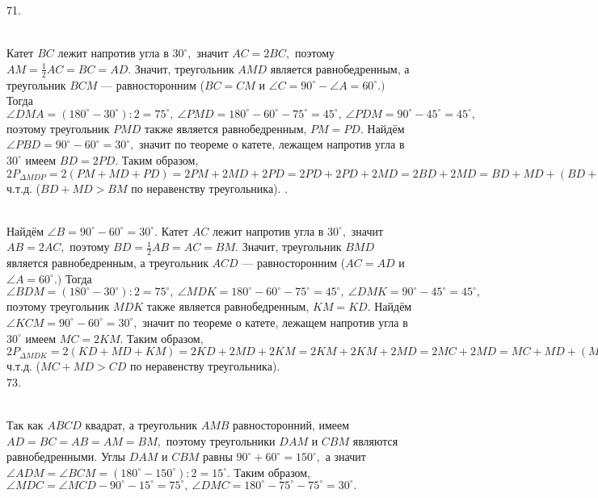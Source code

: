 71. \begin{figure}[ht!]
\end{figure}\\
Катет $BC$ лежит напротив угла в $30^\circ,$ значит $AC=2BC,$ поэтому $AM=\frac{1}{2}AC=BC=AD.$ Значит, треугольник $AMD$ является равнобедренным, а треугольник $BCM$ --- равносторонним ($BC=CM$ и $\angle C=90^\circ-\angle A=60^\circ.)$ Тогда $\angle DMA=(180^\circ-30^\circ):2=75^\circ,\ \angle PMD=180^\circ-60^\circ-75^\circ=45^\circ,\ \angle PDM=90^\circ-45^\circ=45^\circ,$ поэтому треугольник $PMD$ также является равнобедренным, $PM=PD.$ Найдём $\angle PBD=90^\circ-60^\circ=30^\circ,$ значит по теореме о катете, лежащем напротив угла в $30^\circ$ имеем $BD=2PD.$ Таким образом, $2P_{\Delta MDP}=2(PM+MD+PD)=
2PM+2MD+2PD=2PD+2PD+2MD=2BD+2MD=BD+MD+(BD+MD)>BD+MD+BM=P_{\Delta MDB},$ ч.т.д. ($BD+MD>BM$ по неравенству треугольника).\newpage
{}. \begin{figure}[ht!]
\end{figure}\\
Найдём $\angle B=90^\circ-60^\circ=30^\circ.$ Катет $AC$ лежит напротив угла в $30^\circ,$ значит $AB=2AC,$ поэтому $BD=\frac{1}{2}AB=AC=BM.$ Значит, треугольник $BMD$ является равнобедренным, а треугольник $ACD$ --- равносторонним ($AC=AD$ и $\angle A=60^\circ.)$ Тогда $\angle BDM=(180^\circ-30^\circ):2=75^\circ,\ \angle MDK=180^\circ-60^\circ-75^\circ=45^\circ,\ \angle DMK=90^\circ-45^\circ=45^\circ,$ поэтому треугольник $MDK$ также является равнобедренным, $KM=KD.$ Найдём $\angle KCM=90^\circ-60^\circ=30^\circ,$ значит по теореме о катете, лежащем напротив угла в $30^\circ$ имеем $MC=2KM.$ Таким образом, $2P_{\Delta MDK}=2(KD+MD+KM)=
2KD+2MD+2KM=2KM+2KM+2MD=2MC+2MD=MC+MD+(MC+MD)>MC+MD+CD=P_{\Delta DMC},$ ч.т.д. ($MC+MD>CD$ по неравенству треугольника).\\
73. \begin{figure}[ht!]
\end{figure}\\
Так как $ABCD$ квадрат, а треугольник $AMB$ равносторонний, имеем $AD=BC=AB=AM=BM,$ поэтому треугольники $DAM$ и $CBM$ являются равнобедренными. Углы $DAM$ и $CBM$ равны $90^\circ+60^\circ=150^\circ,$ а значит $\angle ADM=\angle BCM=(180^\circ-150^\circ):2=15^\circ.$ Таким образом, $\angle MDC=\angle MCD-90^\circ-15^\circ=75^\circ,\ \angle DMC=180^\circ-75^\circ-75^\circ=30^\circ.$\\
